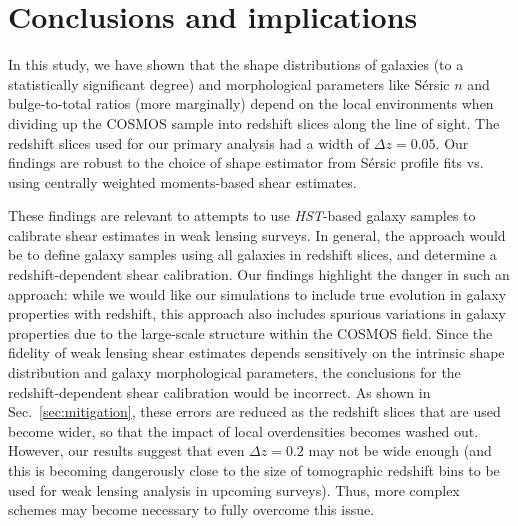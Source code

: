\documentclass[twocolumn,useAMS,usenatbib]{mn2e}
\newcommand{\sersic}{S\'{e}rsic }
\begin{document}
\section{Conclusions and implications}
\label{S:summary}

In this study, we have shown that the shape distributions of galaxies
(to a statistically significant degree) and morphological parameters
like \sersic $n$ and bulge-to-total ratios (more marginally) depend on
the local environments when dividing up the COSMOS sample into
redshift slices along the line of sight.  The redshift slices used for
our primary analysis had
a width of $\Delta z=0.05$.  Our findings are robust to the choice of
shape estimator from \sersic profile fits vs. using centrally weighted
moments-based shear estimates.

These findings are relevant to attempts to use {\em HST}-based galaxy
samples to calibrate shear estimates in weak lensing surveys.  In
general, the approach would be to define galaxy samples using all
galaxies in redshift slices, and determine a redshift-dependent shear
calibration.  Our findings highlight the danger in such an approach:
while we would like our simulations to include true evolution in
galaxy properties with redshift, this approach also includes spurious
variations in galaxy properties due to the large-scale structure
within the COSMOS field.  Since the fidelity of weak lensing shear
estimates depends sensitively on the intrinsic shape distribution and
galaxy morphological parameters, the conclusions for the
redshift-dependent shear calibration would be incorrect.  As shown in
Sec.~\ref{sec:mitigation}, these errors
are reduced as the redshift slices that are used become wider, so
that the impact of local overdensities becomes washed out.  However,
our results suggest that even $\Delta z=0.2$ may not be wide enough
(and this is becoming dangerously close to the size of tomographic
redshift bins to be used for weak lensing analysis in upcoming
surveys).  Thus, more complex schemes may become necessary to fully
overcome this issue.
\end{document}
